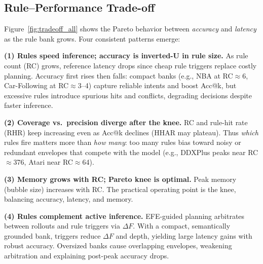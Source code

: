 \documentclass{article} %
\begin{document}
\subsection{Rule--Performance Trade-off}

Figure~\ref{fig:tradeoff_all} shows the Pareto behavior between \emph{accuracy} and \emph{latency} as the rule bank grows. Four consistent patterns emerge:

\textbf{(1) Rules speed inference; accuracy is inverted-U in rule size.}
As rule count (RC) grows, reference latency drops since cheap rule triggers replace costly planning. Accuracy first rises then falls: compact banks (e.g., NBA at RC$\approx$6, Car-Following at RC$\approx$3--4) capture reliable intents and boost Acc@k, but excessive rules introduce spurious hits and conflicts, degrading decisions despite faster inference.

\textbf{(2) Coverage vs.\ precision diverge after the knee.}
RC and rule-hit rate (RHR) keep increasing even as Acc@k declines (HHAR may plateau). Thus \emph{which} rules fire matters more than \emph{how many}: too many rules bias toward noisy or redundant envelopes that compete with the model (e.g., DDXPlus peaks near RC$\approx$376, Atari near RC$\approx$64).

\textbf{(3) Memory grows with RC; Pareto knee is optimal.}
Peak memory (bubble size) increases with RC. The practical operating point is the knee, balancing accuracy, latency, and memory.

\textbf{(4) Rules complement active inference.}
EFE-guided planning arbitrates between rollouts and rule triggers via $\Delta F$. With a compact, semantically grounded bank, triggers reduce $\Delta F$ and depth, yielding large latency gains with robust accuracy. Oversized banks cause overlapping envelopes, weakening arbitration and explaining post-peak accuracy drops.

\end{document}

